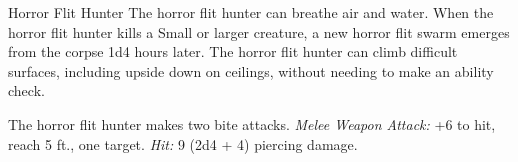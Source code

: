 \documentclass[10pt,a4paper,twoside,twocolumn,openany,bg=print,nodeprecatedcode]{dndbook}
\begin{document}
\clearpage

\begin{DndMonster}[float*=t]{Horror Flit Hunter}
\DndMonsterBasics[
armor-class = {15 (natural armor)},
hit-points = {\DndDice{10d6 + 10}},
speed = {40 ft., 40 ft. (key), 40 ft. (key)}
]
\DndMonsterAbilityScores[
 str = 11,
 dex = 18,
 con = 12,
 int = 3,
 wis = 10,
 cha = 4
]
\DndMonsterDetails[
senses = {blindsight 60 ft. (blind beyond this radius), passive perception 10},
challenge = 2,
]
The horror flit hunter can breathe air and water.
When the horror flit hunter kills a Small or larger creature, a new horror flit swarm emerges from the corpse 1d4 hours later.
The horror flit hunter can climb difficult surfaces, including upside down on ceilings, without needing to make an ability check.
\par
{}
The horror flit hunter makes two bite attacks.
\textsl{Melee Weapon Attack:} +6 to hit, reach 5 ft., one target. \textsl{Hit:} 9 (2d4 + 4) piercing damage.
\end{DndMonster}
\end{document}

